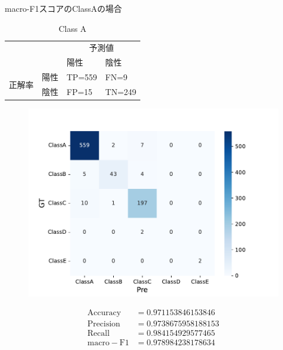 \documentclass[leno,xcolor=dvipsnames]{beamer}
\begin{document}
  \begin{frame}{macro-F1スコアのClassAの場合}
    \begin{minipage}[t]{.48\textwidth}
      \begin{table}
        \caption{Class A} \label{tb:ClassA}
        \begin{adjustbox}{width=\columnwidth, center}
          \begin{tabular}{ccll}
            \toprule
            \multicolumn{2}{c}{} & \multicolumn{2}{c}{予測値} \\ \cline{3-4}
            & & 陽性 & 陰性 \\
            \midrule
            \multirow{2}{*}{正解率} & 陽性 & TP=559 & FN=9 \\
            & 陰性 & FP=15 & TN=249 \\
            \bottomrule
          \end{tabular}
        \end{adjustbox}
      \end{table}
    \end{minipage}\hfill
    \begin{minipage}[t]{.48\textwidth}
      \begin{figure}
        \centering
        \includegraphics[keepaspectratio,scale=0.3]{images/deepimfam_confusion_matrix_cnt.pdf}
      \end{figure}
    \end{minipage}
    \begin{align*}
      \mathrm{Accuracy} &= 0.971153846153846 \\
      \mathrm{Precision} &= 0.9738675958188153 \\
      \mathrm{Recall} &= 0.984154929577465 \\
      \mathrm{macro-F1} &= 0.978984238178634
    \end{align*}
  \end{frame}
\end{document}
